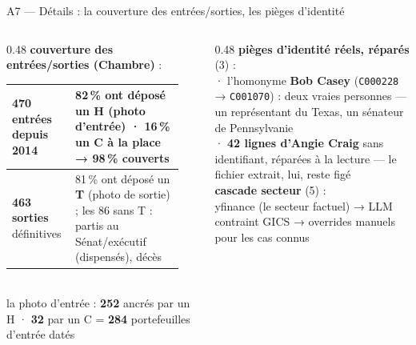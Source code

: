 \documentclass[11pt,aspectratio=169]{beamer}
\newcommand{\co}[1]{\texttt{#1}}
\begin{document}
\begin{frame}{A7 --- Détails : la couverture des entrées/sorties, les pièges d'identité}
  \begin{columns}[T]
    \begin{column}{0.48\textwidth}\footnotesize
      \textbf{couverture des entrées/sorties (Chambre)} :\\[1mm]
      {\scriptsize
      \begin{tabular}{@{}p{0.30\linewidth} p{0.60\linewidth}@{}}
        \toprule
        \textbf{470 entrées} depuis 2014 & 82\,\% ont déposé un \textbf{H} (photo
          d'entrée) · 16\,\% un \textbf{C} à la place → \textbf{98\,\% couverts} \\
        \midrule
        \textbf{463 sorties} définitives & 81\,\% ont déposé un \textbf{T} (photo de
          sortie) ; les 86 sans T : partis au Sénat/exécutif (dispensés), décès \\
        \bottomrule
      \end{tabular}}\\[1.5mm]
      {\scriptsize la photo d'entrée : \textbf{252} ancrés par un H · \textbf{32} par
       un C = \textbf{284} portefeuilles d'entrée datés}
    \end{column}
    \begin{column}{0.48\textwidth}\footnotesize
      \textbf{pièges d'identité réels, réparés} (3) :\\[1mm]
      {\scriptsize
      · l'homonyme \textbf{Bob Casey} (\co{C000228} → \co{C001070}) : deux vraies
        personnes --- un représentant du Texas, un sénateur de Pennsylvanie\\[1mm]
      · \textbf{42 lignes d'Angie Craig} sans identifiant, réparées à la lecture ---
        le fichier extrait, lui, reste figé}\\[3mm]
      \textbf{cascade secteur} (5) :\\[1mm]
      {\scriptsize yfinance (le secteur factuel) → LLM contraint GICS → overrides
       manuels pour les cas connus}
    \end{column}
  \end{columns}
\end{frame}
\end{document}
